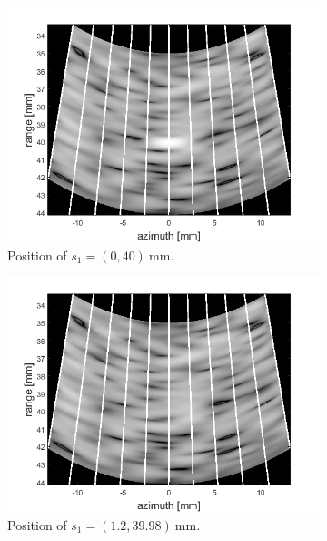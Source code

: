 \begin{figure}[ht]
    \centering
    \begin{subfigure}[t]{0.48\linewidth}
        \includegraphics[width=\linewidth]{./images/others/scallop_loss1.png}
        \caption{Position of $s_1 = (0, 40)~$mm.}
        \label{fig:bf_im1}
    \end{subfigure}
    \quad
    \begin{subfigure}[t]{0.48\linewidth}
        \includegraphics[width=\linewidth]{./images/others/scallop_loss2.png}
        \caption{Position of $s_1 = (1.2, 39.98)~$mm.}
        \label{fig:bf_im2}
    \end{subfigure}
    \quad
    \begin{subfigure}[t]{0.48\linewidth}

\end{subfigure}
\end{figure}
